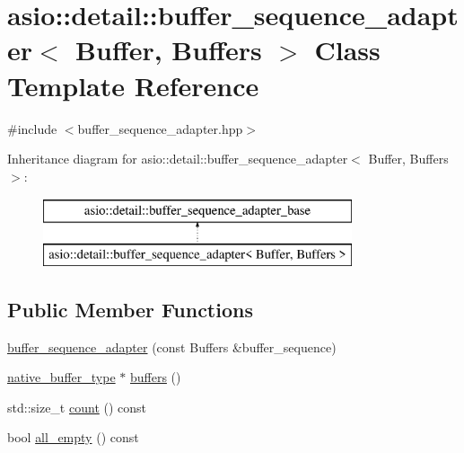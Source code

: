 \hypertarget{classasio_1_1detail_1_1buffer__sequence__adapter}{}\section{asio\+:\+:detail\+:\+:buffer\+\_\+sequence\+\_\+adapter$<$ Buffer, Buffers $>$ Class Template Reference}
\label{classasio_1_1detail_1_1buffer__sequence__adapter}


{\ttfamily \#include $<$buffer\+\_\+sequence\+\_\+adapter.\+hpp$>$}

Inheritance diagram for asio\+:\+:detail\+:\+:buffer\+\_\+sequence\+\_\+adapter$<$ Buffer, Buffers $>$\+:\begin{figure}[H]
\begin{center}
\leavevmode
\includegraphics[height=2.000000cm]{classasio_1_1detail_1_1buffer__sequence__adapter}
\end{center}
\end{figure}
\subsection*{Public Member Functions}
\begin{DoxyCompactItemize}
\item 
\hyperlink{classasio_1_1detail_1_1buffer__sequence__adapter_a2724ed5b8ddf473c14faaaf6ef3c36d4}{buffer\+\_\+sequence\+\_\+adapter} (const Buffers \&buffer\+\_\+sequence)
\item 
\hyperlink{classasio_1_1detail_1_1buffer__sequence__adapter__base_a91d037bd052777b8df514e6b94ec9e71}{native\+\_\+buffer\+\_\+type} $\ast$ \hyperlink{classasio_1_1detail_1_1buffer__sequence__adapter_a1a74a5b93ecc19233184445ee56f6c93}{buffers} ()
\item 
std\+::size\+\_\+t \hyperlink{classasio_1_1detail_1_1buffer__sequence__adapter_ad13a21573cc3e242703a5e3340dcaa36}{count} () const 
\item 
bool \hyperlink{classasio_1_1detail_1_1buffer__sequence__adapter_ae2136ffa6d50978fa5621dbb9099955c}{all\+\_\+empty} () const 
\end{DoxyCompactItemize}

